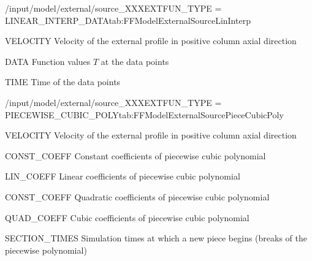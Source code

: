\begin{condsubgroup}{/input/model/external/source\_XXX}{EXTFUN\_TYPE = LINEAR\_INTERP\_DATA}{tab:FFModelExternalSourceLinInterp}
  \begin{dataset}[type=double,unit=\si{\per\second},range={$\geq 0$},length=1]{VELOCITY}
    Velocity of the external profile in positive column axial direction
  \end{dataset}
  \begin{dataset}[type=double,unit=\si{\ExternalUnit},range={$\mathds{R}$},length=Arbitrary]{DATA}
    Function values $T$ at the data points
  \end{dataset}
  \begin{dataset}[type=double,unit=\si{\second},range={$\geq 0.0$},length={Same as \texttt{DATA}}]{TIME}
    Time of the data points
  \end{dataset}
\end{condsubgroup}

\begin{condsubgroup}{/input/model/external/source\_XXX}{EXTFUN\_TYPE = PIECEWISE\_CUBIC\_POLY}{tab:FFModelExternalSourcePieceCubicPoly}
  \begin{dataset}[type=double,unit=\si{\per\second},range={$\geq 0$},length=1]{VELOCITY}
    Velocity of the external profile in positive column axial direction
  \end{dataset}
  \begin{dataset}[type=double,unit=\si{\ExternalUnit},range={$\mathds{R}$},length=Arbitrary]{CONST\_COEFF}
    Constant coefficients of piecewise cubic polynomial
  \end{dataset}
  \begin{dataset}[type=double,unit=\si{\ExternalUnit\per\second},range={$\mathds{R}$},length={Same as \texttt{CONST\_COEFF}}]{LIN\_COEFF}
    Linear coefficients of piecewise cubic polynomial
  \end{dataset}
  \begin{dataset}[type=double,unit=\si{\ExternalUnit\per\square\second},range={$\mathds{R}$},length={Same as \texttt{CONST\_COEFF}}]{CONST\_COEFF}
    Quadratic coefficients of piecewise cubic polynomial
  \end{dataset}
  \begin{dataset}[type=double,unit=\si{\ExternalUnit\per\cubic\second},range={$\mathds{R}$},length={Same as \texttt{CONST\_COEFF}}]{QUAD\_COEFF}
    Cubic coefficients of piecewise cubic polynomial
  \end{dataset}
  \begin{dataset}[type=double,unit=\si{\second},range={$\geq 0.0$},length={\texttt{CONST\_COEFF}+1}]{SECTION\_TIMES}
    Simulation times at which a new piece begins (breaks of the piecewise polynomial)
  \end{dataset}
\end{condsubgroup}

